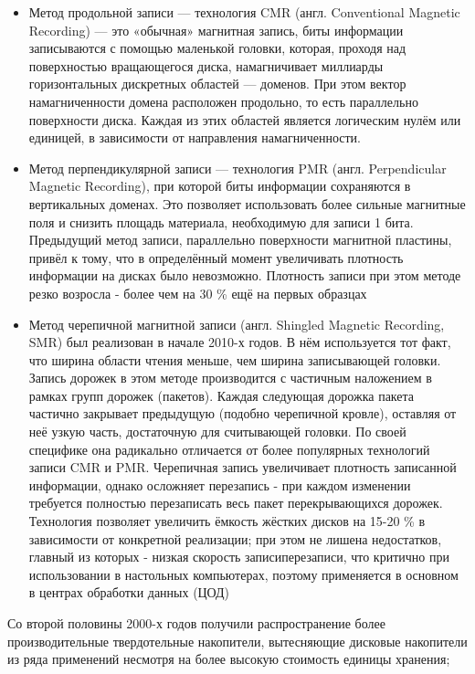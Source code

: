 \begin{itemize}
    \item 
        Метод продольной записи --- технология CMR (англ. Conventional Magnetic Recording) --- это «обычная» магнитная запись, биты информации записываются с помощью маленькой головки, которая, проходя над поверхностью вращающегося диска, намагничивает миллиарды горизонтальных дискретных областей --- доменов. При этом вектор намагниченности домена расположен продольно, то есть параллельно поверхности диска. Каждая из этих областей является логическим нулём или единицей, в зависимости от направления намагниченности. 
    \item 
        Метод перпендикулярной записи --- технология PMR (англ. Perpendicular Magnetic Recording), при которой биты информации сохраняются в вертикальных доменах. Это позволяет использовать более сильные магнитные поля и снизить площадь материала, необходимую для записи 1 бита. Предыдущий метод записи, параллельно поверхности магнитной пластины, привёл к тому, что в определённый момент увеличивать плотность информации на дисках было невозможно. 
        Плотность записи при этом методе резко возросла - более чем на 30 \% ещё на первых образцах
    \item 
        Метод черепичной магнитной записи (англ. Shingled Magnetic Recording, SMR) был реализован в начале 2010-х годов. В нём используется тот факт, что ширина области чтения меньше, чем ширина записывающей головки. Запись дорожек в этом методе производится с частичным наложением в рамках групп дорожек (пакетов). Каждая следующая дорожка пакета частично закрывает предыдущую (подобно черепичной кровле), оставляя от неё узкую часть, достаточную для считывающей головки. По своей специфике она радикально отличается от более популярных технологий записи CMR и PMR.
        Черепичная запись увеличивает плотность записанной информации, однако осложняет перезапись - при каждом изменении требуется полностью перезаписать весь пакет перекрывающихся дорожек. Технология позволяет увеличить ёмкость жёстких дисков на 15-20 \% в зависимости от конкретной реализации; при этом не лишена недостатков, главный из которых - низкая скорость записи\/перезаписи, что критично при использовании в настольных компьютерах, поэтому применяется в основном в центрах обработки данных (ЦОД)
\end{itemize}
Со второй половины 2000-х годов получили распространение более производительные твердотельные накопители, вытесняющие дисковые накопители из ряда применений несмотря на более высокую стоимость единицы хранения; 
